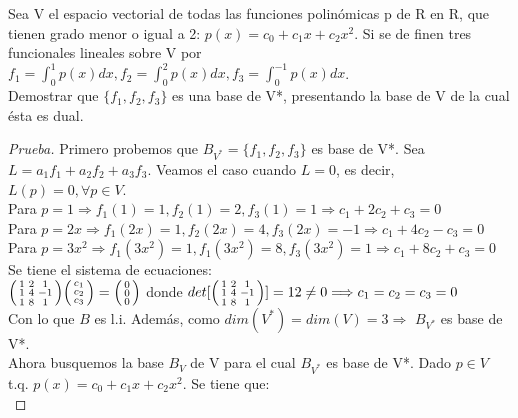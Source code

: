 \documentclass[12pt]{article}
\newenvironment{problem}[2][Problem]{\begin{trivlist}
\item[\hskip \labelsep {\bfseries #1}\hskip \labelsep {\bfseries #2.}]}{\end{trivlist}}
\newenvironment{xmat}
  {\left(\begin{smallmatrix}}
  {\end{smallmatrix}\right)}
\begin{document}
\begin{problem}{5}
Sea V el espacio vectorial de todas las funciones polinómicas p de R en R, que tienen grado menor o igual a 2:  $p(x)= c_{0}+c_{1}x+c_{2}x^{2}$. Si se de finen tres funcionales lineales sobre V por $f_{1}=\int_{0}^{1}p(x)dx, f_{2}=\int_{0}^{2}p(x)dx, f_{3}=\int_{0}^{-1}p(x)dx$. \\
Demostrar que $\{f_{1}, f_{2}, f_{3}\}$ es una base de V*, presentando la base de V de la cual ésta es dual.
\end{problem}

\begin{proof} [Prueba]
Primero probemos que $B_{V^{*}}=\{f_{1}, f_{2}, f_{3}\}$ es base de V*. Sea $L=a_{1}f_{1}+a_{2}f_{2}+a_{3}f_{3}$. Veamos el caso cuando $L=0$, es decir, $L(p)=0, \forall p \in V$.\\
Para $p=1 \Longrightarrow f_{1}(1)=1, f_{2}(1)=2, f_{3}(1)=1 \Longrightarrow c_{1}+2c_{2}+c_{3}=0$\\
Para $p=2x \Longrightarrow f_{1}(2x)=1, f_{2}(2x)=4, f_{3}(2x)=-1 \Longrightarrow c_{1}+4c_{2}-c_{3}=0$\\
Para $p=3x^{2} \Longrightarrow f_{1}(3x^{2})=1, f_{1}(3x^{2})=8, f_{3}(3x^{2})=1 \Longrightarrow c_{1}+8c_{2}+c_{3}=0$\\
Se tiene el sistema de ecuaciones:\\
$\begin{xmat}1 & 2 & 1\\1 & 4 & -1 \\ 1 & 8 & 1\end{xmat}
\begin{xmat}c_{1}\\c_{2} \\ c_{3}\end{xmat}=
\begin{xmat}0\\0 \\ 0\end{xmat}$ donde $det[\begin{xmat}1 & 2 & 1\\1 & 4 & -1 \\ 1 & 8 & 1\end{xmat}]=12 \neq 0 \Longrightarrow c_{1}=c_{2}=c_{3}=0$\\
Con lo que $B$ es l.i. Además, como $dim(V^{*})=dim(V)=3 \Longrightarrow$ $B_{V^{*}}$ es base de V*. \\

Ahora busquemos la base $B_{V}$ de V para el cual $B_{V^{*}}$ es base de V*. 
Dado $p \in V$ t.q. $p(x) = c_{0}+c_{1}x+c_{2}x^{2}$. Se tiene que:\\


\end{proof}
\end{document}
